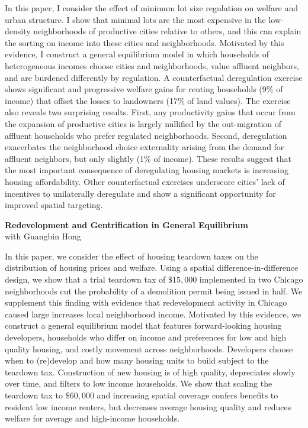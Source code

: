 \documentclass[11pt]{amsart}
\begin{document}
In this paper, I consider the effect of minimum lot size regulation on welfare and urban structure. I show that minimal lots are the most expensive in the low-density neighborhoods of productive cities relative to others, and this can explain the sorting on income into these cities and neighborhoods. Motivated by this evidence, I construct a general equilibrium model in which households of heterogeneous incomes choose cities and neighborhoods, value affluent neighbors, and are burdened differently by regulation. A counterfactual deregulation exercise shows significant and progressive welfare gains for renting households (9\% of income) that offset the losses to landowners (17\% of land values). The exercise also reveals two surprising results. First, any productivity gains that occur from the expansion of productive cities is largely nullified by the out-migration of affluent households who prefer regulated neighborhoods. Second, deregulation exacerbates the neighborhood choice externality arising from the demand for affluent neighbors, but only slightly (1\% of income). These results suggest that the most important consequence of deregulating housing markets is increasing housing affordability. Other counterfactual exercises underscore cities’ lack of incentives to unilaterally deregulate and show a significant opportunity for improved spatial
targeting.  \\


\bigskip
\begin{center}
\LARGE
\textbf{Redevelopment and Gentrification in General Equilibrium}\\
\large
  with Guangbin Hong
\normalsize
\end{center}

In this paper, we consider the effect of housing teardown taxes on the distribution of housing prices and welfare. Using a spatial difference-in-difference design, we show that a trial teardown tax of $\$15,000$ implemented in two Chicago neighborhoods cut the probability of a demolition permit being issued in half. We supplement this finding with evidence that redevelopment activity in Chicago caused large increases local neighborhood income. Motivated by this evidence, we construct a general equilibrium model that features forward-looking housing developers, households who differ on income and preferences for low and high quality housing, and costly movement across neighborhoods. Developers choose when to (re)develop and how many housing units to build subject to the teardown tax. Construction of new housing is of high quality, depreciates slowly over time, and filters to low income households. We show that scaling the teardown tax to $\$60,000$ and increasing spatial coverage confers benefits to resident low income renters, but decreases average housing quality and reduces welfare for average and high-income households.
\end{document}
